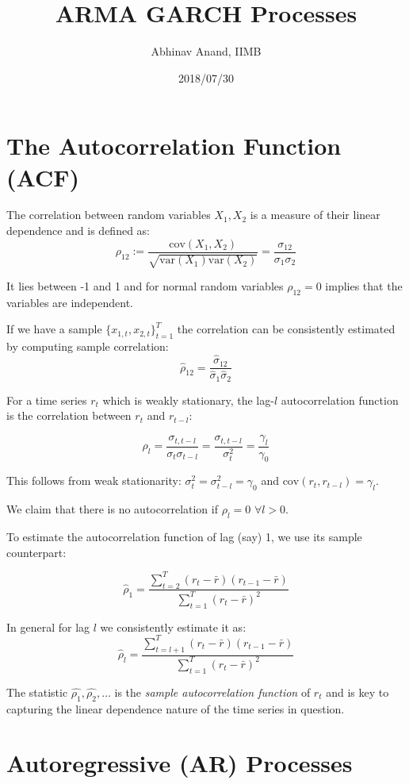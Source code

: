 \documentclass[11pt,]{article}
\title{ARMA GARCH Processes}
\author{Abhinav Anand, IIMB}
\date{2018/07/30}
\begin{document}
\maketitle

\section{The Autocorrelation Function
(ACF)}\label{the-autocorrelation-function-acf}

The correlation between random variables \(X_1, X_2\) is a measure of
their linear dependence and is defined as:
\[\rho_{12}:= \frac{\text{cov}(X_1,X_2)}{\sqrt{\text{var}(X_1)\text{var}(X_2)}}=\frac{\sigma_{12}}{\sigma_1\sigma_2}\]

It lies between -1 and 1 and for normal random variables \(\rho_{12}=0\)
implies that the variables are independent.

If we have a sample \(\{x_{1,t}, x_{2,t}\}_{t=1}^T\) the correlation can
be consistently estimated by computing sample correlation:
\[\hat{\rho}_{12}=\frac{\hat{\sigma}_{12}}{\hat{\sigma}_1\hat{\sigma}_2}\]

For a time series \(r_t\) which is weakly stationary, the lag-\(l\)
autocorrelation function is the correlation between \(r_t\) and
\(r_{t-l}\):

\[\rho_l=\frac{\sigma_{t,t-l}}{\sigma_t\sigma_{t-l}}=\frac{\sigma_{t,t-l}}{\sigma_t^2}
=\frac{\gamma_l}{\gamma_0}\]

This follows from weak stationarity:
\(\sigma^2_t=\sigma^2_{t-l}=\gamma_0\) and
\(\text{cov}(r_t,r_{t-l})=\gamma_l\).

We claim that there is no autocorrelation if \(\rho_l=0\)
\(\forall l>0\).

To estimate the autocorrelation function of lag (say) 1, we use its
sample counterpart:

\[\hat{\rho}_1=\frac{\sum_{t=2}^T (r_t-\bar{r})(r_{t-1}-\bar{r})}{\sum_{t=1}^T (r_t-\bar{r})^2}\]

In general for lag \(l\) we consistently estimate it as:
\[\hat{\rho}_l=\frac{\sum_{t=l+1}^T (r_t-\bar{r})(r_{t-1}-\bar{r})}{\sum_{t=1}^T (r_t-\bar{r})^2}\]

The statistic \(\hat{\rho_1},\hat{\rho_2},\hdots\) is the \emph{sample
autocorrelation function} of \(r_t\) and is key to capturing the linear
dependence nature of the time series in question.

\section{Autoregressive (AR)
Processes}\label{autoregressive-ar-processes}
\end{document}
